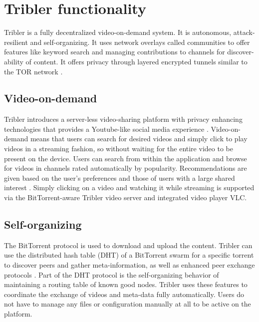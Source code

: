 \chapter{Tribler functionality}\label{ch:tribler}

Tribler is a fully decentralized video-on-demand system. \cite{TriblerOverviewJournal, tribler2014play, tribler-anon-hd}
It is autonomous, attack-resilient and self-organizing. \cite{votecast, tribler-gossip}
It uses network overlays called communities to offer features like keyword search and managing contributions to channels for discover-ability of content.
It offers privacy through layered encrypted tunnels similar to the TOR network \cite{tribler2014at3, dingledine2004tor, dingledine2006design}.


\section{Video-on-demand}
Tribler introduces a server-less video-sharing platform with privacy enhancing technologies that provides a Youtube-like social media experience \cite{PawelOffloading}.
Video-on-demand means that users can search for desired videos and simply click to play videos in a streaming fashion, so without waiting for the entire video to be present on the device.
Users can search from within the application \cite{p2p_search} and browse for videos in channels rated automatically by popularity.
Recommendations are given based on the user's preferences and those of users with a large shared interest  \cite{Wang:SIGIR2007,ClementsIR2007}.
Simply clicking on a video and watching it while streaming is supported via the BitTorrent-aware Tribler video server and integrated video player VLC.


\section{Self-organizing}
The BitTorrent protocol is used to download and upload the content.
Tribler can use the distributed hash table (DHT) of a BitTorrent swarm for a specific torrent to discover peers and gather meta-information, as well as enhanced peer exchange protocols \cite{secure_swarm_discovery, swarm_discovery}.
Part of the DHT protocol is the self-organizing behavior of maintaining a routing table of known good nodes.
Tribler uses these features to coordinate the exchange of videos and meta-data fully automatically.
Users do not have to manage any files or configuration manually at all to be active on the platform.


